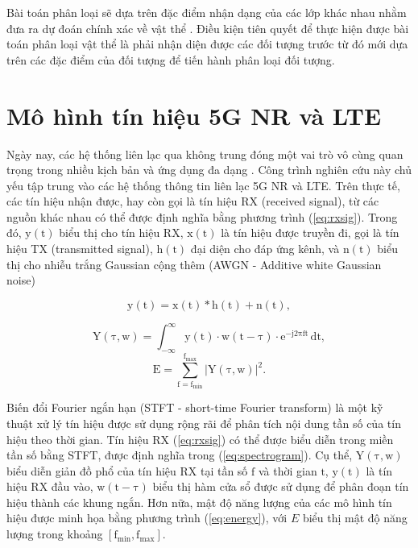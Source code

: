 Bài toán phân loại sẽ dựa trên đặc điểm nhận dạng của các lớp khác nhau nhằm đưa ra dự đoán chính xác về vật thể \cite{leonard2019image}. Điều kiện tiên quyết để thực hiện được bài toán phân loại vật thể là phải nhận diện được các đối tượng trước từ đó mới dựa trên các đặc điểm của đối tượng để tiến hành phân loại đối tượng.

\section{Mô hình tín hiệu 5G NR và LTE}

Ngày nay, các hệ thống liên lạc qua không trung đóng một vai trò vô cùng quan trọng trong nhiều kịch bản và ứng dụng đa dạng \cite{lin20215g}. Công trình nghiên cứu này chủ yếu tập trung vào các hệ thống thông tin liên lạc 5G NR và LTE. Trên thực tế, các tín hiệu nhận được, hay còn gọi là tín hiệu RX (received signal), từ các nguồn khác nhau có thể được định nghĩa bằng phương trình (\ref{eq:rxsig}). Trong đó, $\mathrm{y(t)}$ biểu thị cho tín hiệu RX, $\mathrm{x(t)}$ là tín hiệu được truyền đi, gọi là tín hiệu TX (transmitted signal), $\mathrm{h(t)}$ đại diện cho đáp ứng kênh, và $\mathrm{n(t)}$ biểu thị cho nhiễu trắng Gaussian cộng thêm (AWGN - Additive white Gaussian noise)

\begin{equation}
    \mathrm{y(t) = x(t) * h(t) + n(t)},
    \label{eq:rxsig}
\end{equation}

\begin{equation}
    \mathrm{Y(\tau, w) = \int_{-\infty}^{\infty} y(t) \cdot w(t - \tau) \cdot e^{-j2\pi ft} \, dt},
    \label{eq:spectrogram}
\end{equation}
\begin{equation}
    \mathrm{E = \sum_{f = f_{\text{min}}}^{f_{\text{max}}} \left| Y(\tau, w) \right|^2}.
    \label{eq:energy}
\end{equation}



Biến đổi Fourier ngắn hạn (STFT - short-time Fourier transform) là một kỹ thuật xử lý tín hiệu được sử dụng rộng rãi để phân tích nội dung tần số của tín hiệu theo thời gian. Tín hiệu RX (\ref{eq:rxsig}) có thể được biểu diễn trong miền tần số bằng STFT, được định nghĩa trong (\ref{eq:spectrogram}). Cụ thể, $\mathrm{Y(\tau, w)}$ biểu diễn giản đồ phổ của tín hiệu RX tại tần số $\mathrm{f}$ và thời gian $\mathrm{t}$, $\mathrm{y(t)}$ là tín hiệu RX đầu vào, $\mathrm{w(t - \tau)}$ biểu thị hàm cửa sổ được sử dụng để phân đoạn tín hiệu thành các khung ngắn. Hơn nữa, mật độ năng lượng của các mô hình tín hiệu được minh họa bằng phương trình (\ref{eq:energy}), với $E$ biểu thị mật độ năng lượng trong khoảng $\mathrm{\left [ f_{\min}, f_{\max} \right ]}$.

